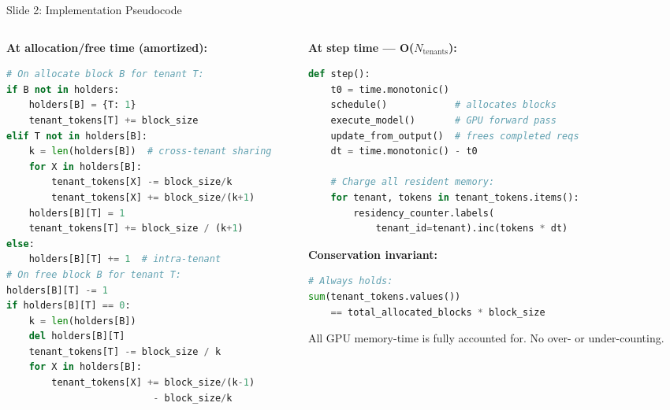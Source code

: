 \documentclass[aspectratio=169,11pt]{beamer}
\begin{document}
\begin{frame}[fragile]{Slide 2: Implementation Pseudocode}
\vspace{-0.7em}
\begin{columns}[T]
\begin{column}{0.47\textwidth}

\textbf{At allocation/free time (amortized):}
\vspace{-0.2em}
\begin{lstlisting}[language=Python, basicstyle=\ttfamily\tiny, morekeywords={self,for,in,if,not,elif,else,del}]
# On allocate block B for tenant T:
if B not in holders:
    holders[B] = {T: 1}
    tenant_tokens[T] += block_size
elif T not in holders[B]:
    k = len(holders[B])  # cross-tenant sharing
    for X in holders[B]:
        tenant_tokens[X] -= block_size/k
        tenant_tokens[X] += block_size/(k+1)
    holders[B][T] = 1
    tenant_tokens[T] += block_size / (k+1)
else:
    holders[B][T] += 1  # intra-tenant
# On free block B for tenant T:
holders[B][T] -= 1
if holders[B][T] == 0:
    k = len(holders[B])
    del holders[B][T]
    tenant_tokens[T] -= block_size / k
    for X in holders[B]:
        tenant_tokens[X] += block_size/(k-1)
                          - block_size/k
\end{lstlisting}

\end{column}
\begin{column}{0.51\textwidth}

\textbf{At step time --- O($N_{\text{tenants}}$):}
\vspace{-0.2em}
\begin{lstlisting}[language=Python, basicstyle=\ttfamily\tiny, morekeywords={self,for,in,if,not}]
def step():
    t0 = time.monotonic()
    schedule()            # allocates blocks
    execute_model()       # GPU forward pass
    update_from_output()  # frees completed reqs
    dt = time.monotonic() - t0

    # Charge all resident memory:
    for tenant, tokens in tenant_tokens.items():
        residency_counter.labels(
            tenant_id=tenant).inc(tokens * dt)
\end{lstlisting}

\vspace{0.2em}
\textbf{Conservation invariant:}
\vspace{-0.2em}
\begin{lstlisting}[language=Python, basicstyle=\ttfamily\tiny, morekeywords={self,for,in,if,not}]
# Always holds:
sum(tenant_tokens.values())
    == total_allocated_blocks * block_size
\end{lstlisting}

\vspace{0.1em}
{\scriptsize All GPU memory-time is fully accounted for. No over- or under-counting.}

\end{column}
\end{columns}

\end{frame}
\end{document}
